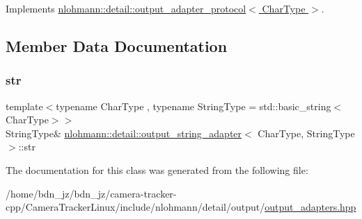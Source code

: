 Implements \hyperlink{structnlohmann_1_1detail_1_1output__adapter__protocol_a2f410a164e0eda17cf6561114b0eee4a}{nlohmann\+::detail\+::output\+\_\+adapter\+\_\+protocol$<$ Char\+Type $>$}.



\subsection{Member Data Documentation}
\mbox{\label{classnlohmann_1_1detail_1_1output__string__adapter_ae57cf7d5c5ec641e25860bb9fb8e6cb9}} 
\subsubsection{\texorpdfstring{str}{str}}
{\footnotesize\ttfamily template$<$typename Char\+Type , typename String\+Type  = std\+::basic\+\_\+string$<$\+Char\+Type$>$$>$ \\
String\+Type\& \hyperlink{classnlohmann_1_1detail_1_1output__string__adapter}{nlohmann\+::detail\+::output\+\_\+string\+\_\+adapter}$<$ Char\+Type, String\+Type $>$\+::str\hspace{0.3cm}{\ttfamily [private]}}



The documentation for this class was generated from the following file\+:\begin{DoxyCompactItemize}
\item 
/home/bdn\+\_\+jz/bdn\+\_\+jz/camera-\/tracker-\/cpp/\+Camera\+Tracker\+Linux/include/nlohmann/detail/output/\hyperlink{output__adapters_8hpp}{output\+\_\+adapters.\+hpp}\end{DoxyCompactItemize}
